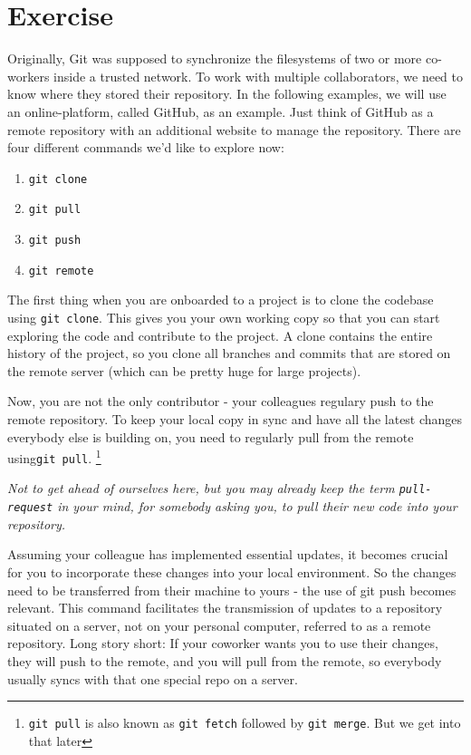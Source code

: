 \documentclass{dcbl/challenge}
\begin{document}
\section*{Exercise}
\begin{aufgabe}
    Originally, Git was supposed to synchronize the filesystems of two or more co-workers inside a trusted network.
    To work with multiple collaborators, we need to know where they stored their repository. 
    In the following examples, we will use an online-platform, called GitHub, as an example.
    Just think of GitHub as a remote repository with an additional website to manage the repository.
    There are four different commands we'd like to explore now:
    \begin{enumerate}
        \item \texttt{git clone}
        \item \texttt{git pull}
        \item \texttt{git push}
        \item \texttt{git remote}
    \end{enumerate}
    The first thing when you are onboarded to a project is to clone the codebase using \texttt{git clone}. This gives you your own working copy so that you can start exploring the code and contribute to the project. A clone contains the entire history of the project, so you clone all branches and commits that are stored on the remote server (which can be pretty huge for large projects).

    Now, you are not the only contributor - your colleagues regulary push to the remote repository. To keep your local copy in sync and have all the latest changes everybody else is building on, you need to regularly pull from the remote using\texttt{git pull}.
    \footnote[1]{\texttt{git pull} is also known as \texttt{git fetch} followed by \texttt{git merge}. But we get into that later} 
    
\textit{Not to get ahead of ourselves here, but you may already keep the term \texttt{pull-request} in your mind, for somebody asking you, to pull their new code into your repository.}

   Assuming your colleague has implemented essential updates, it becomes crucial for you to incorporate these changes into your local environment. So the changes need to be transferred from their machine to yours - the use of git push becomes relevant. This command facilitates the transmission of updates to a repository situated on a server, not on your personal computer, referred to as a remote repository. 
   Long story short: If your coworker wants you to use their changes, they will push to the remote, and you will pull from the remote, so everybody usually syncs with that one special repo on a server.
   

\end{aufgabe}
\end{document}
